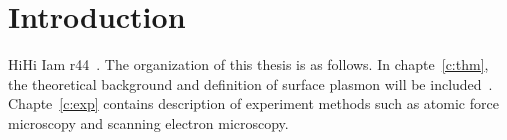 \chapter{Introduction}
\label{c:intro}

HiHi Iam r44~. The organization of this thesis is as follows. In chapte~\ref{c:thm}, the theoretical background and definition of surface plasmon will be included~\cite{maier2007plasmonics}. Chapte~\ref{c:exp} contains description of experiment methods such as atomic force microscopy and scanning electron microscopy. 

%
%